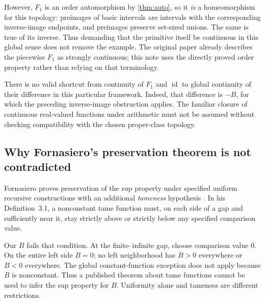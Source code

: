 \documentclass[11pt,letterpaper]{article}
\numberwithin{equation}{section}
\theoremstyle{definition}
\theoremstyle{remark}
\newcommand{\id}{\operatorname{id}}
\newcommand{\source}[2]{\cite[#1]{#2}}
\begin{document}
However, $F_1$ is an order automorphism by \cref{thm:auto}, so it \emph{is}
a homeomorphism for this topology: preimages of basic intervals are
intervals with the corresponding inverse-image endpoints, and preimages
preserve set-sized unions. The same is true of its inverse. Thus demanding
that the primitive itself be continuous in this global sense does not
remove the example. The original paper already describes the piecewise
$F_1$ as strongly continuous; this note uses the directly proved order
property rather than relying on that terminology.

There is no valid shortcut from continuity of $F_1$ and $\id$ to global
continuity of their difference in this particular framework. Indeed,
that difference is $-B$, for which the preceding inverse-image obstruction
applies. The familiar closure of continuous real-valued functions under
arithmetic must not be assumed without checking compatibility with the
chosen proper-class topology.

\subsection{Why Fornasiero's preservation theorem is not contradicted}
Fornasiero proves preservation of the sup property under specified uniform
recursive constructions with an additional \emph{tameness} hypothesis
\source{Theorem~3}{Fornasiero}. In his Definition~3.1, a nonconstant tame
function must, on each side of a gap and sufficiently near it, stay
strictly above or strictly below any specified comparison value.

Our $B$ fails that condition. At the finite--infinite gap, choose comparison
value $0$. On the entire left side $B=0$; no left neighborhood has
$B>0$ everywhere or $B<0$ everywhere. The global constant-function exception
does not apply because $B$ is nonconstant. Thus a published theorem about
tame functions cannot be used to infer the sup property for $B$.
Uniformity alone and tameness are different restrictions.
\end{document}
